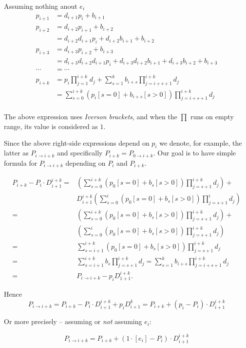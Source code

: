 \documentclass[10pt]{article}
\begin{document}
Assuming nothing anout \(e_i\)
\begin{align*}
p_{i+1} &= d_{i+1}p_i + b_{i+1}\\
p_{i+2} &= d_{i+2}p_{i+1} + b_{i+2} \\
        &= d_{i+2} d_{i+1} p_i + d_{i+2} b_{i+1} + b_{i+2} \\
p_{i+3} &= d_{i+3}p_{i+2} + b_{i+3} \\
        &= d_{i+3}d_{i+2}d_{i+1}p_i + d_{i+3}d_{i+2}b_{i+1} + 
           d_{i+3}b_{i+2} + b_{i+3} \\
\cdots  &= \cdots \\
p_{i+k} &= p_i \prod_{j=1}^{i+k} d_j +
           \sum_{s=1}^k b_{i+s} \prod_{j=i+s+1}^{i+k} d_j \\
        &= \sum_{s=0}^{i+k} (p_i[s=0] + b_{i+s}[s>0]) \prod_{j=i+s+1}^{i+k} d_j \\
\end{align*}

The above expression uses \emph{Iverson brackets},
and when the \(\prod\) runs on empty range, its value
is considered as $1$.
 
Since the above right-side expressions depend on \(p_i\)
we denote, for example, the latter as \(P_{i \to i+k}\)
and specifically \(P_{i+k} = P_{0 \to i+k}\).
Our goal is to have simple formula for \(P_{i\to i+k}\)
depending on \(P_i\) and \(P_{i+k}\).


\begin{align*}
P_{i+k} - P_i \cdot D_{i+1}^{i+k} 
=& \left(\sum_{s=0}^{i+k} (p_0[s=0] + b_s[s>0]) \prod_{j=s+1}^{i+k} d_j\right) + \\
 & D_{i+1}^{i+k} 
   \left(
   \sum_{s=0}^i (p_0[s=0] + b_s[s>0]) \prod_{j=s+1}^i d_j
   \right) \\
=& \left(\sum_{s=0}^{i+k} (p_0[s=0] + b_s[s>0]) \prod_{j=s+1}^{i+k} d_j\right) + \\
 & \left(
   \sum_{s=0}^i (p_0[s=0] + b_s[s>0]) \prod_{j=s+1}^{i+k} d_j
   \right) \\
=& \sum_{s=i+1}^{i+k} (p_0[s=0] + b_s[s>0]) \prod_{j=s+1}^{i+k} d_j \\
=& \sum_{s=i+1}^{i+k} b_s \prod_{j=s+1}^{i+k} d_j 
    = \sum_{s=1}^k b_{i+s} \prod_{j=i+s+1}^{i+k} d_j \\
=& P_{i\to i+k} -  p_i D_{1+1}^{i+k}.
\end{align*}

Hence 
\begin{equation*}
P_{i\to i+k} 
  = P_{i+k} - P_i \cdot D_{i+1}^{i+k} + p_i D_{i+1}^k
  = P_{i+k} + (p_i - P_i) \cdot D_{i+1}^{i+k} 
\end{equation*}

Or more precisely -- assuming or \emph{not} assuming \(e_i\):

\begin{equation*}
P_{i\to i+k} = P_{i+k} + (1\cdot[e_i] - P_i) \cdot D_{i+1}^{i+k} 
\end{equation*}
\end{document}
